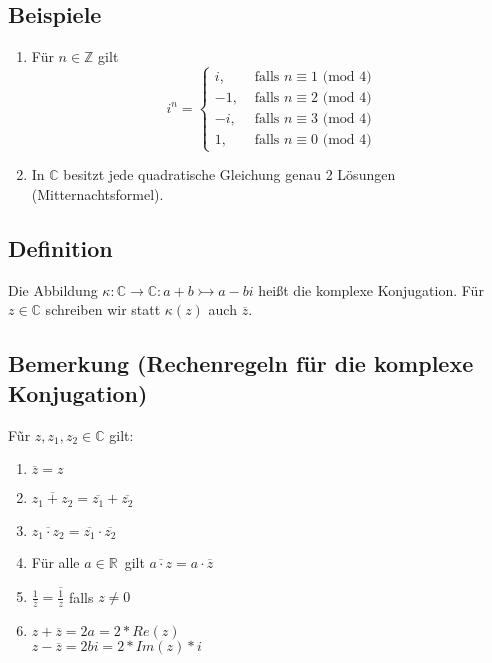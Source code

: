 \subsection{Beispiele}
\begin{enumerate}
	\item Für $n \in \mathbb{Z}$ gilt
	\[i^n = \begin{cases}
	i,  &\text{ falls } n \equiv 1 \text{ (mod 4)}\\
	-1, &\text{ falls } n \equiv 2 \text{ (mod 4)}\\
	-i, &\text{ falls } n \equiv 3 \text{ (mod 4)}\\
	1,  &\text{ falls } n \equiv 0 \text{ (mod 4)}
	\end{cases} \]

	\item In $\mathbb{C}$ besitzt jede quadratische Gleichung genau 2 Lösungen (Mitternachtsformel).
\end{enumerate}

\subsection{Definition}
Die Abbildung $\kappa: \mathbb{C} \rightarrow \mathbb{C}: a+b \rightarrowtail a-bi$ heißt die komplexe Konjugation.
Für $z \in \mathbb{C}$ schreiben wir statt $\kappa(z)$ auch $\overline{z}$.

\subsection{Bemerkung (Rechenregeln für die komplexe Konjugation)}
\label{sec:regeln-komplexe}
Fũr $z, z_1, z_2 \in \mathbb{C}$ gilt:
\begin{enumerate}
\item $\overline{z} = z$
\item $\overline{z_1 + z_2} = \overline{z_1} + \overline{z_2}$
\item $\overline{z_1 \cdot z_2} = \overline{z_1} \cdot \overline{z_2}$
\item Für alle $a \in \mathbb{R}$ gilt $\overline{a \cdot z} = a \cdot \overline{z}$
\item $\frac{1}{\overline{z}} = \overline{\frac{1}{z}}$ falls $z \neq 0$
\item $z + \overline{z} = 2 a = 2 * Re(z)$ \\
	$z - \overline{z} = 2 bi = 2 * Im(z) * i$
\end{enumerate}

